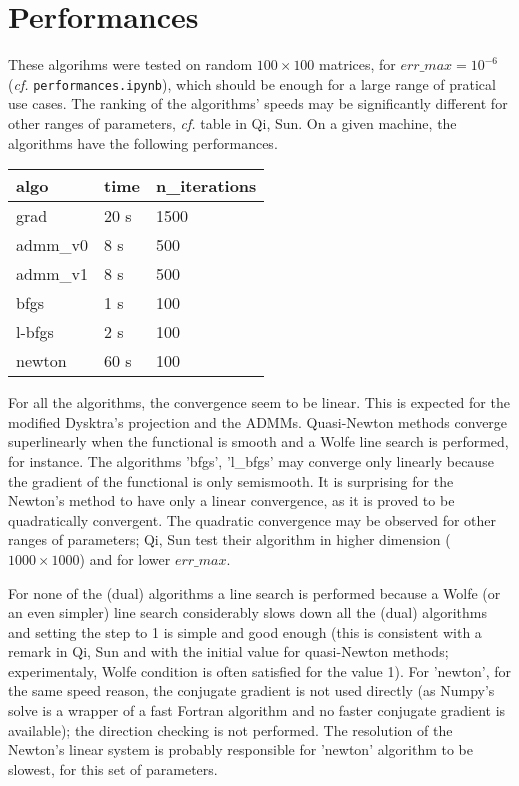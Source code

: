 \documentclass{article}
\begin{document}
\section{Performances}

These algorihms were tested on random $100 \times 100$ matrices, for $err\_max =10^{-6}$ (\emph{cf.} \texttt{performances.ipynb}), which should be enough for a large range of pratical use cases. The ranking of the algorithms' speeds may be significantly different for other ranges of parameters, \emph{cf.} table in Qi, Sun. On a given machine, the algorithms have the following performances.

\medskip

\begin{center}
\begin{tabular}{lll}
 algo     & time  & n\_iterations \\ \hline
 grad     & 20 s  & 1500          \\
 admm\_v0 & 8 s   & 500           \\
 admm\_v1 & 8 s   & 500           \\
 bfgs     & 1 s   & 100           \\
 l-bfgs   & 2 s   & 100           \\
 newton   & 60 s  & 100           \\
\end{tabular}
\end{center}

\medskip

For all the algorithms, the convergence seem to be linear. This is expected for the modified Dysktra's projection and the ADMMs. Quasi-Newton methods converge superlinearly when the functional is smooth and a Wolfe line search is performed, for instance. The algorithms 'bfgs', 'l\_bfgs' may converge only linearly because the gradient of the functional is only semismooth. It is surprising for the Newton's method to have only a linear convergence, as it is proved to be quadratically convergent. The quadratic convergence may be observed for other ranges of parameters; Qi, Sun test their algorithm in higher dimension ($1000 \times 1000$) and for lower $err\_max$. 

\medskip

For none of the (dual) algorithms a line search is performed because a Wolfe (or an even simpler) line search considerably slows down all the (dual) algorithms and setting the step to 1 is simple and good enough (this is consistent with a remark in Qi, Sun and with the initial value for quasi-Newton methods; experimentaly, Wolfe condition is often satisfied for the value 1). For 'newton', for the same speed reason, the conjugate gradient is not used directly (as Numpy's solve is a wrapper of a fast Fortran algorithm and no faster conjugate gradient is available); the direction checking is not performed. The resolution of the Newton's linear system is probably responsible for 'newton' algorithm to be slowest, for this set of parameters.
\end{document}
